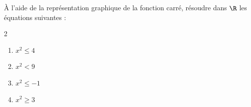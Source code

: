 \begin{exo}{}
	À l'aide de la représentation graphique de la fonction carré, résoudre dans $\R$ les équations suivantes :
	\vspace*{-2mm}
	\begin{multicols}{2}
		\begin{enumerate}[itemsep=2mm]
			\item $x^2 \le 4$
			\item $x^2 < 9$
			\item $x^2 \le -1$
			\item $x^2 \ge 3$
		\end{enumerate}
	\end{multicols}\vspace*{-2mm}
\end{exo}
